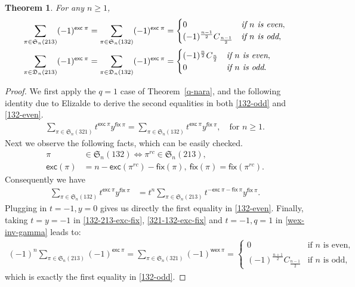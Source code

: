 \documentclass[12pt,reqno]{amsart}
\numberwithin{equation}{section}
\theoremstyle{plain}
\newtheorem{theorem}{Theorem}[section]
\theoremstyle{definition}
\def\S{\mathfrak{S}}
\def\D{\mathfrak{D}}
\def\exc{\mathsf{exc}}
\def\fix{\mathsf{fix}}
\def\wex{\mathsf{wex}}
\begin{document}
\begin{theorem}\label{nara-others}
For any $n\ge 1$,
\begin{align}
\label{132-odd}
\sum_{\pi\in\S_n(213)}(-1)^{\exc\:\pi}=\sum_{\pi\in\S_n(132)}(-1)^{\exc\:\pi}&=\begin{cases}0 & \emph{if $n$ is even},\\
(-1)^{\frac{n-1}{2}}C_{\frac{n-1}{2}} & \emph{if $n$ is odd},
\end{cases}\\
\label{132-even}
\sum_{\pi\in\D_n(213)}(-1)^{\exc\:\pi}=\sum_{\pi\in\D_n(132)}(-1)^{\exc\:\pi}&=\begin{cases}(-1)^{\frac{n}{2}}C_{\frac{n}{2}} & \emph{if $n$ is even},\\
0 & \emph{if $n$ is odd}.
\end{cases}
\end{align}
\end{theorem}
\begin{proof}
We first apply the $q=1$ case of Theorem~\ref{q-nara}, and the following identity due to Elizalde \cite{Eli} to derive the second equalities in both \eqref{132-odd} and \eqref{132-even}.
\begin{align}\label{321-132-exc-fix}
\sum_{\pi\in\S_n(321)}t^{\exc\:\pi}y^{\fix\:\pi}=\sum_{\pi\in\S_n(132)}t^{\exc\:\pi}y^{\fix\:\pi}, \quad \text{for $n\ge 1$}.
\end{align}
Next we observe the following facts, which can be easily checked.
\begin{align*}
\pi &\in\S_n(132) \Leftrightarrow \pi^{rc}\in\S_n(213),\\
\exc(\pi) &= n-\exc(\pi^{rc})-\fix(\pi),\: \fix(\pi)=\fix(\pi^{rc}).
\end{align*}
Consequently we have
\begin{align}\label{132-213-exc-fix}
\sum_{\pi\in\S_n(132)}t^{\exc\:\pi}y^{\fix\:\pi} &= t^n\sum_{\pi\in\S_n(213)}t^{-\exc\:\pi-\fix\:\pi}y^{\fix\:\pi}.
\end{align}
Plugging in $t=-1,y=0$ gives us directly the first equality in \eqref{132-even}. Finally, taking $t=y=-1$ in \eqref{132-213-exc-fix}, \eqref{321-132-exc-fix} and $t=-1,q=1$ in \eqref{wex-inv-gamma} leads to:
\begin{align*}
(-1)^n\sum_{\pi\in\S_n(213)}(-1)^{\exc\:\pi}=\sum_{\pi\in\S_n(321)}(-1)^{\wex\:\pi}=\begin{cases}0 & \textrm{if $n$ is even},\\
(-1)^{\frac{n+1}{2}}C_{\frac{n-1}{2}} & \textrm{if $n$ is odd},
\end{cases}
\end{align*}
which is exactly the first equality in \eqref{132-odd}.
\end{proof}
\end{document}
